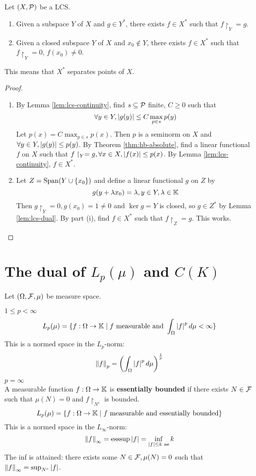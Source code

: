 \documentclass{article}
\begin{document}
\begin{thm}\label{thm:hb-lcs}
  Let $(X, \mathcal P)$ be a LCS.
  \begin{enumerate}
    \item Given a subspace $Y$ of $X$ and $g \in Y^*$, there exists $f \in X^*$ such that $f\restriction_Y = g$.
    \item Given a closed subspace $Y$ of $X$ and $x_0 \nin Y$, there exists $f \in X^*$ such that $f\restriction_Y = 0$, $f(x_0) \ne 0$.
  \end{enumerate}
\end{thm}
\begin{rmk}
  This means that $X^*$ separates points of $X$.
\end{rmk}
\begin{proof}~
  \begin{enumerate}
    \item By Lemma \ref{lem:lcs-continuity}, find $s \subseteq \mathcal P$ finite, $C \ge 0$ such that
    $$\forall y \in Y, \left\lvert g(y)\right\rvert \le C\max_{p \in s}p(y)$$
    Let $p(x) = C\max_{p \in s}p(x)$. Then $p$ is a seminorm on $X$ and $\forall y \in Y, \left\lvert g(y)\right\rvert \le p(y)$. By Theorem \ref{thm:hb-absolute}, find a linear functional $f$ on $X$ such that $f\restriction_Y = g, \forall x \in X, \left\lvert f(x)\right\rvert \le p(x)$. By Lemma \ref{lem:lcs-continuity}, $f \in X^*$.
    \item Let $Z = \operatorname{Span}(Y \cup \{x_0\})$ and define a linear functional $g$ on $Z$ by
    $$g(y + \lambda x_0) = \lambda, y \in Y, \lambda \in \mathbb K$$
    Then $g\restriction_Y = 0, g(x_0) = 1 \ne 0$ and $\ker g = Y$ is closed, so $g \in Z^*$ by Lemma \ref{lem:lcs-dual}. By part (i), find $f \in X^*$ such that $f\restriction_Z = g$. This works.
  \end{enumerate}
\end{proof}

\clearpage

\section{The dual of \texorpdfstring{$L_p(\mu)$ and $C(K)$}{Lp(mu) or C(K)}}

Let $(\Omega, \mathcal F, \mu)$ be measure space.

$1 \le p < \infty$
$$L_p(\mu) = \{f : \Omega \to \mathbb K \mid f \text{ measurable and } \int_\Omega \left\lvert f\right\rvert^p d\mu < \infty\}$$
This is a normed space in the $L_p$-norm:
$$\left\lVert f\right\rVert_p = \left(\int_\Omega \left\lvert f\right\rvert^p d\mu\right)^{\frac 1p}$$

$p = \infty$ \\
A measurable function $f : \Omega \to \mathbb K$ is {\bf essentially bounded} if there exists $N \in \mathcal F$ such that $\mu(N) = 0$ and $f\restriction_{N^c}$ is bounded.
$$L_p(\mu) = \{f : \Omega \to \mathbb K \mid f \text{ measurable and essentially bounded}\}$$
This is a normed space in the $L_\infty$-norm:
$$\left\lVert f\right\rVert_\infty = \operatorname{ess sup} \left\lvert f\right\rvert = \inf_{\left\lvert f\right\rvert \le k \text{ ae}} k$$
The inf is attained: there exists some $N \in \mathcal F, \mu(N) = 0$ such that $\left\lVert f\right\rVert_\infty = \sup_{N^c} \left\lvert f\right\rvert$.
\end{document}
